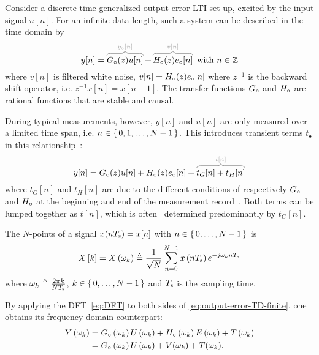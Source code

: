 Consider a discrete-time generalized output-error \gls{LTI} set-up, excited by the input signal $u[n]$.
For an infinite data length, such a system can be described in the time domain by
\begin{equation}
  y[n] = \ezbrace{\true{G}(z) u[n]}{\true{y}[n]} + \ezbrace{\true{H}(z) \true{e}[n]}{v[n]} \text{ with } n \in \IntegerNumbers
  \label{eq:output-error-TD-infinite}
\end{equation}
where $v[n]$ is filtered white noise, $v[n] = {H}_{\circ}(z) {e}_{\circ}[n]$ where $z^{-1}$ is the backward shift operator, i.e. $z^ {-1}x[n] = x[n-1]$.
The transfer functions ${G}_{\circ}$ and ${H}_{\circ}$ are rational functions that are stable and causal.

During typical measurements, however, $y[n]$ and $u[n]$ are only measured over a limited time span, i.e. $n \in \set{0,1,\ldots,N-1}$.
This introduces transient terms $t_{\bullet}$ in this relationship~\citep{Pintelon1997ARB}:
\begin{equation}
y[n] = \true{G}(z) u[n] + \true{H}(z) \true{e}[n] + \ezbrace{t_G[n] + t_H[n]}{t[n]}
\label{eq:output-error-TD-finite}
\end{equation}
where $t_G[n]$ and $t_H[n]$ are due to the different conditions of respectively ${G}_{\circ}$ and ${H}_{\circ}$ at the beginning and end of the measurement record~\citep{Pintelon1997ARB}.
Both terms can be lumped together as $t[n]$, which is often~\citep{Pintelon2010LPM1} determined predominantly by $t_G[n]$.

\begin{definition}\label{def:DFT}
The $N$-points  of a signal $x(nT_{\mathrm{s}}) = x[n]$ with $n \in \set{0,\ldots,N-1}$ is
\begin{equation}
  X \left[ k \right] =
  X \left( \omega_k \right)
  \triangleq
  \frac{1}{\sqrt{N}}\sum_{n=0}^{N-1} x \left( n T_{\mathrm{s}} \right)  e^{- j \omega_k n T_{\mathrm{s}} }
  \label{eq:DFT}
\end{equation}
where $\omega_k \triangleq \tfrac{2 \pi k }{N T_{\mathrm{s}}}$, $k \in \set{0,\ldots,N-1}$ and $T_{\mathrm{s}}$ is the sampling time.
\end{definition}

By applying the \gls{DFT}~\eqref{eq:DFT} to both sides of \eqref{eq:output-error-TD-finite}, one obtains its frequency-domain counterpart:
\begin{align}
    Y \left( \omega_k \right) 
    & = {G}_{\circ} \left( \omega_k \right) U \left( \omega_k \right) 
      + {H}_{\circ} \left( \omega_k \right) E \left( \omega_k \right)
      + T \left( \omega_k \right)\\
      &= {G}_{\circ} \left( \omega_k \right) U \left( \omega_k \right)  + V(\omega_k) + T(\omega_k)
      \text{.}
  \label{eq:output-error-FD}
\end{align}

